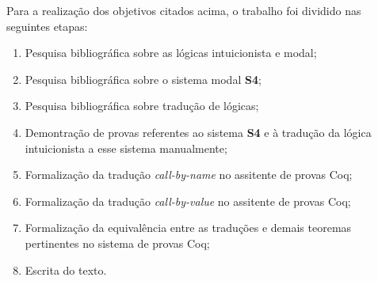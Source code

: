 Para a realização dos objetivos citados acima, o trabalho foi dividido nas seguintes etapas:

\begin{enumerate}
    \item Pesquisa bibliográfica sobre as lógicas intuicionista e modal;
    \item Pesquisa bibliográfica sobre o sistema modal \textbf{S4};
    \item Pesquisa bibliográfica sobre tradução de lógicas;
    \item Demontração de provas referentes ao sistema \textbf{S4} e à tradução da lógica intuicionista a esse sistema manualmente;
    \item Formalização da tradução \textit{call-by-name} no assitente de provas Coq;
    \item Formalização da tradução \textit{call-by-value} no assitente de provas Coq;
    \item Formalização da equivalência entre as traduções e demais teoremas pertinentes no sistema de provas Coq;
    \item Escrita do texto.
\end{enumerate}

